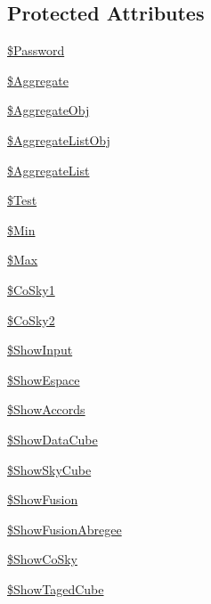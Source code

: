 \subsection*{Protected Attributes}
\begin{DoxyCompactItemize}
\item 
\hyperlink{class_page_run_analysis_a33140178c72eac9898d9cf3025e913af}{\$\+Password}
\item 
\hyperlink{class_page_run_analysis_aeb3e753eef87926bb5b6e82a963b1bfd}{\$\+Aggregate}
\item 
\hyperlink{class_page_run_analysis_a65c8bc8621932f0821b2704b4ae9ebbc}{\$\+Aggregate\+Obj}
\item 
\hyperlink{class_page_run_analysis_aaa505c2ce6fc76a22f2b251872270827}{\$\+Aggregate\+List\+Obj}
\item 
\hyperlink{class_page_run_analysis_a7b61b05386d0cbe3e0883352321bac2e}{\$\+Aggregate\+List}
\item 
\hyperlink{class_page_run_analysis_a9aa60c38d41b7dd1dbd3143c9c7e9554}{\$\+Test}
\item 
\hyperlink{class_page_run_analysis_afec58332b7821ca351da921736811775}{\$\+Min}
\item 
\hyperlink{class_page_run_analysis_a070b0622e5c50b9bc545cb5ca08233e4}{\$\+Max}
\item 
\hyperlink{class_page_run_analysis_a0c141883c763857ca85aab7712a624cd}{\$\+Co\+Sky1}
\item 
\hyperlink{class_page_run_analysis_a978ce81d8cd98cbd1b02d87d33936ad1}{\$\+Co\+Sky2}
\item 
\hyperlink{class_page_run_analysis_a27c5314b30255e709fc852b23b8e0b9c}{\$\+Show\+Input}
\item 
\hyperlink{class_page_run_analysis_a7585f5ed9f448c7cca326800ae8b0d29}{\$\+Show\+Espace}
\item 
\hyperlink{class_page_run_analysis_a5b432256d4f69d4cc3d68dc93800283f}{\$\+Show\+Accords}
\item 
\hyperlink{class_page_run_analysis_a04718490ada67d0572a1ee1caf985bff}{\$\+Show\+Data\+Cube}
\item 
\hyperlink{class_page_run_analysis_a17754c6e30be66834f07ac5c100a6345}{\$\+Show\+Sky\+Cube}
\item 
\hyperlink{class_page_run_analysis_a12f10e34ba28524bfa77bc7925d124ce}{\$\+Show\+Fusion}
\item 
\hyperlink{class_page_run_analysis_a45d6f4138e33411a56ad659a3c5fb776}{\$\+Show\+Fusion\+Abregee}
\item 
\hyperlink{class_page_run_analysis_a564f2eb8407d31d5464b8cf166c9e092}{\$\+Show\+Co\+Sky}
\item 
\hyperlink{class_page_run_analysis_ad8ba6b97c86d1392f544901b94c92606}{\$\+Show\+Taged\+Cube}
\end{DoxyCompactItemize}


